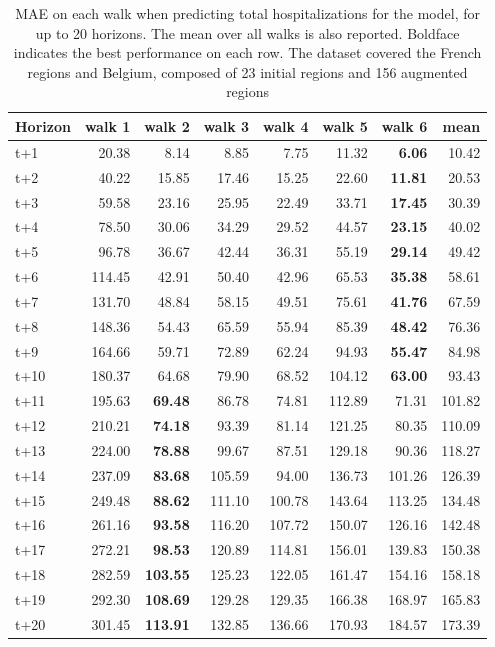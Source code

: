 \begin{table}[H]
\centering
\caption{MAE on each walk when predicting total hospitalizations for the model, for up to 20 horizons. The mean over all walks is also reported. Boldface indicates the best performance on each row. The dataset covered the French regions and Belgium, composed of 23 initial regions and 156 augmented regions }
\label{tab:MAE_walk_baseline}
\begin{tabular}{lrrrrrrr}
\toprule
Horizon &  walk 1 &  walk 2 &  walk 3 &  walk 4 &  walk 5 &  walk 6 &   mean \\
\midrule
t+1  & 20.38  & 8.14  & 8.85  & 7.75  & 11.32  & \textbf{6.06}  & 10.42  \\
t+2  & 40.22  & 15.85  & 17.46  & 15.25  & 22.60  & \textbf{11.81}  & 20.53  \\
t+3  & 59.58  & 23.16  & 25.95  & 22.49  & 33.71  & \textbf{17.45}  & 30.39  \\
t+4  & 78.50  & 30.06  & 34.29  & 29.52  & 44.57  & \textbf{23.15}  & 40.02  \\
t+5  & 96.78  & 36.67  & 42.44  & 36.31  & 55.19  & \textbf{29.14}  & 49.42  \\
t+6  & 114.45  & 42.91  & 50.40  & 42.96  & 65.53  & \textbf{35.38}  & 58.61  \\
t+7  & 131.70  & 48.84  & 58.15  & 49.51  & 75.61  & \textbf{41.76}  & 67.59  \\
t+8  & 148.36  & 54.43  & 65.59  & 55.94  & 85.39  & \textbf{48.42}  & 76.36  \\
t+9  & 164.66  & 59.71  & 72.89  & 62.24  & 94.93  & \textbf{55.47}  & 84.98  \\
t+10  & 180.37  & 64.68  & 79.90  & 68.52  & 104.12  & \textbf{63.00}  & 93.43  \\
t+11  & 195.63  & \textbf{69.48}  & 86.78  & 74.81  & 112.89  & 71.31  & 101.82  \\
t+12  & 210.21  & \textbf{74.18}  & 93.39  & 81.14  & 121.25  & 80.35  & 110.09  \\
t+13  & 224.00  & \textbf{78.88}  & 99.67  & 87.51  & 129.18  & 90.36  & 118.27  \\
t+14  & 237.09  & \textbf{83.68}  & 105.59  & 94.00  & 136.73  & 101.26  & 126.39  \\
t+15  & 249.48  & \textbf{88.62}  & 111.10  & 100.78  & 143.64  & 113.25  & 134.48  \\
t+16  & 261.16  & \textbf{93.58}  & 116.20  & 107.72  & 150.07  & 126.16  & 142.48  \\
t+17  & 272.21  & \textbf{98.53}  & 120.89  & 114.81  & 156.01  & 139.83  & 150.38  \\
t+18  & 282.59  & \textbf{103.55}  & 125.23  & 122.05  & 161.47  & 154.16  & 158.18  \\
t+19  & 292.30  & \textbf{108.69}  & 129.28  & 129.35  & 166.38  & 168.97  & 165.83  \\
t+20  & 301.45  & \textbf{113.91}  & 132.85  & 136.66  & 170.93  & 184.57  & 173.39  \\

\bottomrule
\end{tabular}
\end{table}
